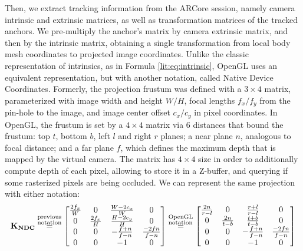 Then, we extract tracking information from the ARCore session, namely camera intrinsic and extrinsic matrices, as well as transformation matrices of the tracked anchors. We pre-multiply the anchor's matrix by camera extrinsic matrix, and then by the intrinsic matrix, obtaining a single transformation from local body mesh coordinates to projected image coordinates. Unlike the classic representation of intrinsics, as in Formula \ref{lit:eq:intrinsic}, OpenGL uses an equivalent representation, but with another notation, called Native Device Coordinates. Formerly, the projection frustum was defined with a $3 \times 4$ matrix, parameterized with image width and height $W/H$, focal lengths $f_x/f_y$ from the pin-hole to the image, and image center offset $c_x/c_y$ in pixel coordinates. In OpenGL, the frustum is set by a $4 \times 4$ matrix via 6 distances that bound the frustum: top $t$, bottom $b$, left $l$ and right $r$ planes; a near plane $n$, analogous to focal distance; and a far plane $f$, which defines the maximum depth that is mapped by the virtual camera. The matrix has $4 \times 4$ size in order to additionally compute depth of each pixel, allowing to store it in a Z-buffer, and querying if some rasterized pixels are being occluded. We can represent the same projection with either notation:
\begin{equation}
	\bm{\mathrm{K_{NDC}}} \overset{\begin{subarray}{l}\text{previous} \\ \text{notation}\end{subarray}}{=} 
	\begin{bmatrix} 
		\tfrac{2f_x}{W} & 0                & \tfrac{W - 2c_x}{W}  & 0 \\ 
		0               & \tfrac{2f_x}{H}  & \tfrac{H - 2c_y}{H}  & 0 \\
		0               & 0                & -\tfrac{f + n}{f - n} & \tfrac{-2fn}{f - n} \\
		0               & 0                & -1                   & 0
	\end{bmatrix} \overset{\begin{subarray}{l}\text{OpenGL} \\ \text{notation}\end{subarray}}{=} 
	\begin{bmatrix} 
		\tfrac{2n}{r - l} & 0              & \tfrac{r + l}{r - l} & 0 \\
		0               & \tfrac{2n}{t - b}  & \tfrac{t + b}{t - b} & 0 \\
		0               & 0                & -\tfrac{f + n}{f - n} & \tfrac{-2fn}{f - n} \\
		0               & 0                & -1                   & 0
	\end{bmatrix}
	\label{methods:eq:ndc-projection}
\end{equation}


